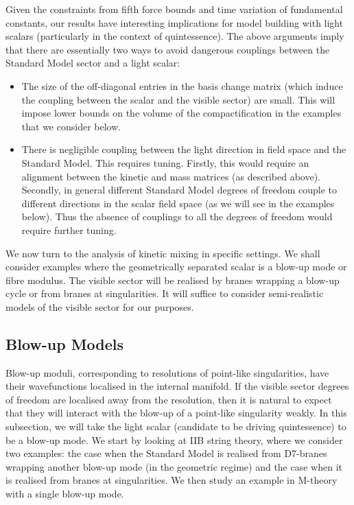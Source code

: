 \documentclass[11pt,a4paper]{article}
\begin{document}
Given the constraints from fifth force bounds and time variation of fundamental constants, our results have interesting implications for model building with light scalars (particularly in the context of quintessence). The above arguments imply that there are essentially two ways to avoid dangerous couplings between the Standard Model sector and a light scalar: 
%
\begin{itemize}
%
\item The size of the off-diagonal entries in the basis change matrix (which induce the coupling between the scalar and the visible sector) are small. This will impose lower bounds on the volume of the compactification in the examples that we consider below. 
\item There is negligible coupling between the light direction in field space and the Standard Model. This requires tuning. Firstly, this would require an alignment between the kinetic and mass matrices (as described above). Secondly, in general different Standard Model degrees of freedom couple to different directions in the scalar field space (as we will see in the examples below). Thus the absence of couplings to all the degrees of freedom would require further tuning.  
%      
     \end{itemize}
%
We now turn to the analysis of kinetic mixing in specific settings. We shall consider examples where the geometrically separated scalar is a blow-up mode or fibre modulus. The visible sector will be realised by branes wrapping a blow-up cycle or from branes at singularities. It will suffice to consider semi-realistic models of the visible sector for our purposes.

\subsection{Blow-up Models}

Blow-up moduli, corresponding to resolutions of point-like singularities, have their wavefunctions localised in the internal manifold. If the visible sector degrees of freedom are localised away from the resolution, then it is natural to expect that they will interact with the blow-up of a point-like singularity weakly. In this subsection, we will take the light scalar (candidate to be driving quintessence) to be a blow-up mode. We start by looking at IIB  string theory, where we consider two examples: the case when the Standard Model is realised from D7-branes wrapping another blow-up mode (in the geometric regime) and the case when it is realised from branes at singularities.  We then study an example in M-theory with a single blow-up mode.
\end{document}
